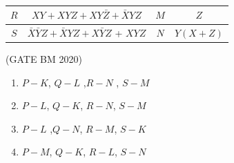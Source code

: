 \begin{enumerate}[label=\arabic*.,ref=\theenumi]
\begin{table}[!ht]
{\begin{tabular}{|c|c|c|c|}
	\hline 

	$R$ & $XY + XYZ +XY\bar{Z} + \bar{X}YZ$ & $M$ & $Z$ \\

	\hline

	$S$ & $\bar{X}\bar{Y}Z + \bar{X}YZ + X\bar{Y}Z$ + $XYZ$ & $N$ & $Y(X+Z)$ \\

	\hline 
\end{tabular}
		}
		\caption{}
		\label{fig:GATE BM 2020}
	\end{table}
		\hfill(GATE BM 2020)
	\begin{enumerate}[label=(\Alph*)]
			\item $P-K$, $Q-L$ ,$R-N$ , $S-M$ \\
			\item $P-L$, $Q-K$, $R-N$, $S-M$ \\
			\item $P-L$ ,$Q-N$, $R-M$, $S-K$ \\
			\item $P-M$, $Q-K$, $R-L$, $S-N$ \\
	\end{enumerate}


\end{enumerate}
